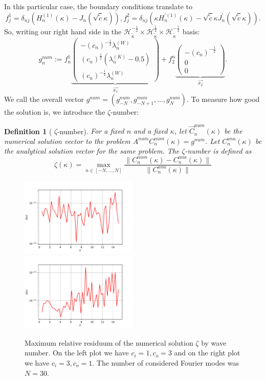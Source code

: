 \documentclass[12pt,journal,compsoc, onecolumn]{IEEEtran}
\newtheorem{definition}[theorem]{Definition}
\begin{document}
In this particular case, the boundary conditions translate to $$f^1_j =  \delta_{nj} \left(H_n^{(1)}(\kappa) -  J_n(\sqrt{\tilde c} \kappa)  \right),
f^2_j = \delta_{nj} \left(\kappa H_n^{\prime(1)}(\kappa)
- \sqrt{\tilde c} \kappa J_n^{\prime}(\sqrt{\tilde c}\kappa) \right).$$
So, writing our right hand side in the $\mathcal{H}_{\tilde \kappa}^{-\frac{1}{2}} \times \mathcal{H}_{\tilde \kappa}^{\frac{1}{2}} \times \mathcal{H}_{\tilde \kappa}^{-\frac{1}{2}}$ basis: 
$$
g^{num}_n
:=  f^1_n 
\underbrace{
\begin{pmatrix}
- (c_n)^{-\frac{1}{2}} \lambda_n^{(W)} \\
(c_n)^{\frac{1}{2}} (\lambda_n^{(K)} - 0.5)  \\
(c_n)^{-\frac{1}{2}} \lambda_n^{(W)} 
\end{pmatrix}}_{\vec{x_1}}
+ f_2^n 
\underbrace{\begin{pmatrix}
    -(c_n)^{-\frac{1}{2}}  \\
    0 \\
    0
\end{pmatrix}}_{\vec{x_2}}.
$$
We call the overall vector $g^{num} = (g^{num}_{-N}, g^{num}_{-N + 1}, ..., g^{num}_{N})$.
To measure how good the solution is, we introduce the $\zeta$-number: 
\begin{definition}[ $\zeta$-number]
    For a fixed $n$ and a fixed $\kappa$, let $\vec{C}^{num}_n(\kappa)$ be the numerical solution vector to the problem 
    $A^{num} {C}^{num}_n(\kappa) = g^{num}$. 
    Let ${C}^{ana}_n(\kappa)$ be the analytical solution vector for the same problem.
    The $\zeta$-number is defined as 
    $$
        \zeta(\kappa)=  \max\limits_{n \in [-N, ..., N]}\frac{\|{C}^{num}_n(\kappa) - {C}^{ana}_n(\kappa)\|}{\|{C}^{ana}_n(\kappa)\|}
    $$ 
\end{definition}  \noindent
\begin{figure}
    \includegraphics[width=0.5\textwidth]{validate_sol_c_i1,0c_o3,0N_30plotRangeStart_0,5plotRangeEnd_15,0.pdf}
    \includegraphics[width=0.5\textwidth]{validate_sol_c_i3,0c_o1,0N_30plotRangeStart_0,5plotRangeEnd_15,0.pdf}
    \caption{Maximum relative residuum of the numerical solution $\zeta$ by wave number. 
    On the left plot we have $c_i = 1, c_o = 3$
    and on the right plot we have $c_i = 3, c_o = 1$. The number of considered Fourier modes was $N = 30$.}
    \label{fig:sol_validation}
\end{figure}
\end{document}

